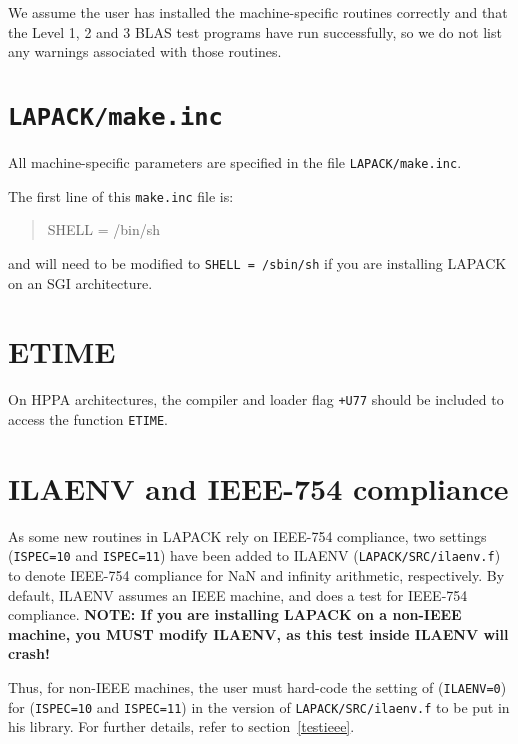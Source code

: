 \documentclass[11pt]{report}
\begin{document}
We assume the user has installed the machine-specific routines
correctly and that the Level 1, 2 and 3 BLAS test programs have run
successfully, so we do not list any warnings associated with those
routines.

\section{\texttt{LAPACK/make.inc}}

All machine-specific
parameters are specified in the file \texttt{LAPACK/make.inc}.

The first line of this \texttt{make.inc} file is:
\begin{quote}
SHELL = /bin/sh
\end{quote}
and will need to be modified to \texttt{SHELL = /sbin/sh} if you are
installing LAPACK on an SGI architecture.

\section{ETIME}

On HPPA architectures,
the compiler and loader flag \texttt{+U77} should be included to access
the function \texttt{ETIME}.

\section{ILAENV and IEEE-754 compliance}

%

As some new routines in LAPACK rely on IEEE-754 compliance,
two settings (\texttt{ISPEC=10} and \texttt{ISPEC=11}) have been added to ILAENV
(\texttt{LAPACK/SRC/ilaenv.f}) to denote IEEE-754 compliance for NaN and
infinity arithmetic, respectively.  By default, ILAENV assumes an IEEE
machine, and does a test for IEEE-754 compliance.  \textbf{NOTE:  If you
are installing LAPACK on a non-IEEE machine, you MUST modify ILAENV,
as this test inside ILAENV will crash!}

Thus, for non-IEEE machines, the user must hard-code the setting of
(\texttt{ILAENV=0}) for (\texttt{ISPEC=10} and \texttt{ISPEC=11}) in the version
of \texttt{LAPACK/SRC/ilaenv.f} to be put in
his library.  For further details, refer to section~\ref{testieee}.
\end{document}
